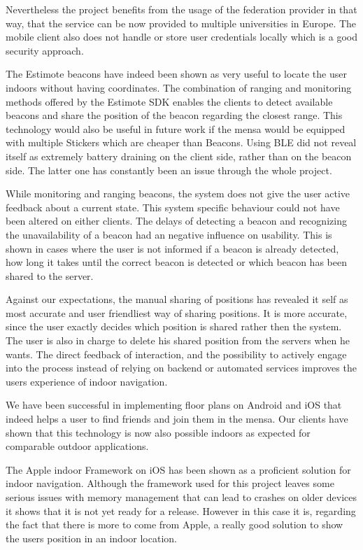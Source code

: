 Nevertheless the project benefits from the usage of the federation provider in that way, that the service can be now provided to multiple universities in Europe. The mobile client also does not handle or store user credentials locally which is a good security approach. 

The Estimote beacons have indeed been shown as very useful to locate the user indoors without having coordinates. The combination of ranging and monitoring methods offered by the Estimote SDK enables the clients to detect available beacons and share the position of the beacon regarding the closest range. This technology would also be useful in future work if the mensa would be equipped with multiple Stickers which are cheaper than Beacons. Using BLE did not reveal itself as extremely battery draining on the client side, rather than on the beacon side. The latter one has constantly been an issue through the whole project. 

While monitoring and ranging beacons, the system does not give the user active feedback about a current state. This system specific behaviour could not have been altered on either clients. The delays of detecting a beacon and recognizing the unavailability of a beacon had an negative influence on usability. This is shown in cases where the user is not informed if a beacon is already detected, how long it takes until the correct beacon is detected or which beacon has been shared to the server. 

Against our expectations, the manual sharing of positions has revealed it self as most accurate and user friendliest way of sharing positions. It is more accurate, since the user exactly decides which position is shared rather then the system. The user is also in charge to delete his shared position from the servers when he wants. The direct feedback of interaction, and the possibility to actively engage into the process instead of relying on backend or automated services improves the users experience of indoor navigation. 

We have been successful in implementing floor plans on Android and iOS that indeed helps a user to find friends and join them in the mensa. Our clients have shown that this technology is now also possible indoors as expected for comparable outdoor applications. 

The Apple indoor Framework on iOS has been shown as a proficient solution for indoor navigation. Although the framework used for this project leaves some serious issues with memory management that can lead to crashes on older devices it shows that it is not yet ready for a release. However in this case it is, regarding the fact that there is more to come from Apple, a really good solution to show the users position in an indoor location.

